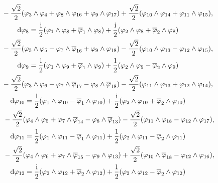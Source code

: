 \documentclass[10pt,a4paper]{amsart}
\numberwithin{equation}{section}
\begin{document}
\begin{Example}
\begin{gather*}
\hphantom{{\rm d} \varphi_{9} =}{} - \frac{\sqrt{2}}{2} (\varphi_3 \wedge \varphi_4 + \varphi_8 \wedge \varphi_{16} + \varphi_9 \wedge \varphi_{17} ) + \frac{\sqrt{2}}{2} (\varphi_{10} \wedge \varphi_{14} + \varphi_{11} \wedge \varphi_{15}),\\
{\rm d} \varphi_8 = \frac{{\rm i}}{2} (\varphi_1 \wedge \varphi_8 + \overline \varphi_1 \wedge \varphi_8) + \frac{{\rm i}}{2} (\varphi_2 \wedge \varphi_8 + \overline \varphi_2 \wedge \varphi_8)\\
\hphantom{{\rm d} \varphi_{9} =}{} - \frac{\sqrt{2}}{2} (\varphi_3 \wedge \varphi_5 - \varphi_7 \wedge \overline \varphi_{16} + \varphi_9 \wedge \varphi_{18} ) - \frac{\sqrt{2}}{2} (\varphi_{10} \wedge \varphi_{13} - \varphi_{12} \wedge \varphi_{15}),\\
{\rm d} \varphi_9 = \frac{{\rm i}}{2} (\varphi_1 \wedge \varphi_9 + \overline \varphi_1 \wedge \varphi_9) + \frac{1}{2} (\varphi_2 \wedge \varphi_9 - \overline \varphi_2 \wedge \varphi_9)\\
\hphantom{{\rm d} \varphi_{9} =}{} - \frac{\sqrt{2}}{2} (\varphi_3 \wedge \varphi_6 - \varphi_7 \wedge \overline \varphi_{17} - \varphi_8 \wedge \overline \varphi_{18} ) - \frac{\sqrt{2}}{2} (\varphi_{11} \wedge \varphi_{13} +\varphi_{12} \wedge \varphi_{14}),\\
{\rm d} \varphi_{10} = \frac{1}{2} (\varphi_1 \wedge \varphi_{10} - \overline \varphi_1 \wedge \varphi_{10}) + \frac{{\rm i}}{2} (\varphi_2 \wedge \varphi_{10} + \overline \varphi_2 \wedge \varphi_{10})\\
\hphantom{{\rm d} \varphi_{18} =}{} - \frac{\sqrt{2}}{2} (\varphi_4 \wedge \varphi_5 + \varphi_7 \wedge \overline \varphi_{14} - \varphi_8 \wedge \overline \varphi_{13} ) - \frac{\sqrt{2}}{2} (\varphi_{11} \wedge \varphi_{18} - \varphi_{12} \wedge \varphi_{17}),\\
{\rm d} \varphi_{11} = \frac{1}{2} (\varphi_1 \wedge \varphi_{11} - \overline \varphi_1 \wedge \varphi_{11}) + \frac{1}{2} (\varphi_2 \wedge \varphi_{11} - \overline \varphi_2 \wedge \varphi_{11}) \\
\hphantom{{\rm d} \varphi_{18} =}{} - \frac{\sqrt{2}}{2} (\varphi_4 \wedge \varphi_6 + \varphi_7 \wedge \overline \varphi_{15} - \varphi_9 \wedge \varphi_{13} ) + \frac{\sqrt{2}}{2} (\varphi_{10} \wedge \overline \varphi_{18} - \varphi_{12} \wedge \varphi_{16}),\\
{\rm d} \varphi_{12} = \frac{{\rm i}}{2} (\varphi_2 \wedge \varphi_{12} + \overline \varphi_2 \wedge \varphi_{12}) + \frac{1}{2} (\varphi_2 \wedge \varphi_{12} - \overline \varphi_2 \wedge \varphi_{12}) \\

\end{gather*}
\end{Example}
\end{document}
